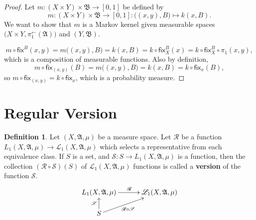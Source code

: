 \documentclass[
twoside=true,
paper=letter,
fontsize=9pt,
pagesize=auto,
leqno,
openany,
headsepline,
overfullrule,
]{scrbook}
\theoremstyle{plain}
\theoremstyle{plain}
\theoremstyle{definition}
\theoremstyle{bfnoteitalic}
\theoremstyle{bfnoteroman}
\newtheorem{defnboldnote}[thm]{Definition}
\newcommand{\term}[1]{\textbf{#1}\index{#1}}
\newcommand{\sigalg}[1]{\mathfrak{#1}}
\newcommand{\cali}[1]{\mathscr{#1}}
\newcommand{\sfop}[1]{\mathsf{#1}}
\newcommand{\preimage}[1]{#1^{\leftarrow}}
\newcommand{\sigmaalgebra}{\sigalg{A}}
\newcommand{\sigmaalgebraii}{\sigalg{B}}
\newcommand{\Lone}{L_1(\measurespace, \sigmaalgebra, \measure)}
\newcommand{\caliLone}{\cali{L}_1(\measurespace, \sigmaalgebra, \measure)}
\newcommand{\measurespace}{X}
\newcommand{\measurespaceii}{Y}
\newcommand{\mspaceelt}{x}
\newcommand{\mspaceeltii}{y}
\newcommand{\measure}{\mu}
\newcommand{\setii}{B}
\newcommand{\regular}{\cali{R}}
\newcommand{\selection}{\cali{S}}
\newcommand{\projectionone}{\pi_1}
\newcommand{\markovkernel}{k}
\newcommand{\markovkernelii}{m}
\newcommand{\fixinthefirst}[1]{\sfop{fix}_{#1}}
\newcommand{\fixinthesecond}[1]{\sfop{fix}^{#1}}
\begin{document}
\begin{proof}
Let
$\markovkernelii:
(\measurespace\times\measurespaceii) \times \sigmaalgebraii 
\to
[0,1]$
be defined by
\[
\markovkernelii:
(\measurespace\times\measurespaceii) \times \sigmaalgebraii 
\to
[0,1]
: 
\bigl((\mspaceelt,\mspaceeltii),\setii\bigr)\mapsto 
\markovkernel(\mspaceelt,\setii).
\]
We want to show that 
$\markovkernelii$ is a Markov kernel given measurable spaces
$\bigl(\measurespace\times\measurespaceii, \preimage\projectionone(\sigmaalgebra)\bigr)$
and
$(\measurespaceii, \sigmaalgebraii)$.

\[
\markovkernelii\circ
\fixinthesecond{\setii}(\mspaceelt,\mspaceeltii)
=
\markovkernelii\bigl((\mspaceelt,\mspaceeltii),\setii\bigr)
=
\markovkernel(\mspaceelt,\setii)
=
\markovkernel\circ\fixinthesecond{\setii}_\measurespace(\mspaceelt)
=
\markovkernel\circ\fixinthesecond{\setii}_\measurespace\circ\projectionone(\mspaceelt,\mspaceeltii),
\]
which is a composition of measurable functions.
Also by definition,
\[
\markovkernelii\circ\fixinthefirst{(\mspaceelt,\mspaceeltii)}(\setii)
=
\markovkernelii\bigl((\mspaceelt,\mspaceeltii),\setii\bigr)
=
\markovkernel(\mspaceelt,\setii)
=
\markovkernel\circ\fixinthefirst{\mspaceelt}(\setii),
\]
so
$\markovkernelii\circ\fixinthefirst{(\mspaceelt,\mspaceeltii)}
=
\markovkernel\circ\fixinthefirst{\mspaceelt}$, which is a probability measure.
\end{proof}




\section{Regular Version}
\begin{defnboldnote}\label{version}
Let $(\measurespace,\sigmaalgebra,\measure)$ be a measure space.
Let 
$\regular$ be a function $\Lone\to\caliLone$ which selects a representative from each equivalence class.  
If $S$ is a set, and $\selection: S \to \Lone$ is a function, then
the collection $(\regular\circ\selection)(S)$ of 
$\caliLone$ functions is called a \term{version} of the function $\selection$.
\[
\xymatrix@R=16pt@C=30pt{ 
\Lone \ar[r]^{\regular} & \caliLone \\
S \ar[ur]_-{\ \regular\circ\selection} \ar[u]^{\selection} & \\
}
\]
\end{defnboldnote}
\end{document}
